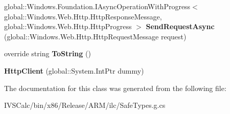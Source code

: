 \begin{DoxyCompactItemize}
global\+::\+Windows.\+Foundation.\+I\+Async\+Operation\+With\+Progress$<$ global\+::\+Windows.\+Web.\+Http.\+Http\+Response\+Message, global\+::\+Windows.\+Web.\+Http.\+Http\+Progress $>$ {\bfseries Send\+Request\+Async} (global\+::\+Windows.\+Web.\+Http.\+Http\+Request\+Message request)
\item 
\mbox{\label{class_windows_1_1_web_1_1_http_1_1_http_client_a649e21fae58b67e6dcf87c4f4c7fd711}} 
override string {\bfseries To\+String} ()
\item 
\mbox{\label{class_windows_1_1_web_1_1_http_1_1_http_client_a375894a36751ce007d8632850ca5b413}} 
{\bfseries Http\+Client} (global\+::\+System.\+Int\+Ptr dummy)
\end{DoxyCompactItemize}


The documentation for this class was generated from the following file\+:\begin{DoxyCompactItemize}
\item 
I\+V\+S\+Calc/bin/x86/\+Release/\+A\+R\+M/ilc/Safe\+Types.\+g.\+cs\end{DoxyCompactItemize}
